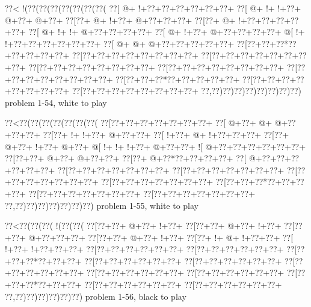 \vbox{\vbox{\goo
\0??<\- !(\0??(\0??(\0??(\0??(\0??(\0??(\0??(
\0??[\- @+\- !+\0??+\0??+\0??+\0??+\0??+\0??+
\0??[\- @+\- !+\- !+\0??+\- @+\0??+\- @+\0??+
\0??[\0??+\- @+\- !+\0??+\- @+\0??+\0??+\0??+
\0??[\0??+\- @+\- !+\0??+\0??+\0??+\0??+\0??+
\0??[\- @+\- !+\- !+\- @+\0??+\0??+\0??+\0??+
\0??[\- @+\- !+\0??+\- @+\0??+\0??+\0??+\0??+
\- @[\- !+\- !+\0??+\0??+\0??+\0??+\0??+\0??+
\0??[\- @+\- @+\- @+\0??+\0??+\0??+\0??+\0??+
\0??[\0??+\0??+\0??*\0??+\0??+\0??+\0??+\0??+
\0??[\0??+\0??+\0??+\0??+\0??+\0??+\0??+\0??+
\0??[\0??+\0??+\0??+\0??+\0??+\0??+\0??+\0??+
\0??[\0??+\0??+\0??+\0??+\0??+\0??+\0??+\0??+
\0??[\0??+\0??+\0??+\0??+\0??+\0??+\0??+\0??+
\0??[\0??+\0??+\0??+\0??+\0??+\0??+\0??+\0??+
\0??[\0??+\0??+\0??*\0??+\0??+\0??+\0??+\0??+
\0??[\0??+\0??+\0??+\0??+\0??+\0??+\0??+\0??+
\0??[\0??+\0??+\0??+\0??+\0??+\0??+\0??+\0??+
\0??,\0??)\0??)\0??)\0??)\0??)\0??)\0??)\0??)
}
\hfil problem 1-54, white to play\hfil\break
}

\vbox{\vbox{\goo
\0??<\0??(\0??(\0??(\0??(\0??(\0??(\0??(
\0??[\0??+\0??+\0??+\0??+\0??+\0??+\0??+
\0??[\- @+\0??+\- @+\- @+\0??+\0??+\0??+
\0??[\0??+\- !+\- !+\0??+\- @+\0??+\0??+
\0??[\- !+\0??+\- @+\- !+\0??+\0??+\0??+
\0??[\0??+\- @+\0??+\- !+\0??+\- @+\0??+
\- @[\- !+\- !+\- !+\0??+\- @+\0??+\0??+
\- ![\- @+\0??+\0??+\0??+\0??+\0??+\0??+
\0??[\0??+\0??+\- @+\0??+\- @+\0??+\0??+
\0??[\0??+\- @+\0??*\0??+\0??+\0??+\0??+
\0??[\- @+\0??+\0??+\0??+\0??+\0??+\0??+
\0??[\0??+\0??+\0??+\0??+\0??+\0??+\0??+
\0??[\0??+\0??+\0??+\0??+\0??+\0??+\0??+
\0??[\0??+\0??+\0??+\0??+\0??+\0??+\0??+
\0??[\0??+\0??+\0??+\0??+\0??+\0??+\0??+
\0??[\0??+\0??+\0??*\0??+\0??+\0??+\0??+
\0??[\0??+\0??+\0??+\0??+\0??+\0??+\0??+
\0??[\0??+\0??+\0??+\0??+\0??+\0??+\0??+
\0??,\0??)\0??)\0??)\0??)\0??)\0??)\0??)
}
\hfil problem 1-55, white to play\hfil\break
}

\vbox{\vbox{\goo
\0??<\0??(\0??(\0??(\- !(\0??(\0??(
\0??[\0??+\0??+\- @+\0??+\- !+\0??+
\0??[\0??+\0??+\- @+\0??+\- !+\0??+
\0??[\0??+\0??+\- @+\0??+\0??+\0??+
\0??[\0??+\0??+\- @+\0??+\- !+\0??+
\0??[\0??+\- !+\- @+\- !+\0??+\0??+
\0??[\- !+\0??+\- !+\0??+\0??+\0??+
\0??[\0??+\0??+\0??+\0??+\0??+\0??+
\0??[\0??+\0??+\0??+\0??+\0??+\0??+
\0??[\0??+\0??+\0??*\0??+\0??+\0??+
\0??[\0??+\0??+\0??+\0??+\0??+\0??+
\0??[\0??+\0??+\0??+\0??+\0??+\0??+
\0??[\0??+\0??+\0??+\0??+\0??+\0??+
\0??[\0??+\0??+\0??+\0??+\0??+\0??+
\0??[\0??+\0??+\0??+\0??+\0??+\0??+
\0??[\0??+\0??+\0??*\0??+\0??+\0??+
\0??[\0??+\0??+\0??+\0??+\0??+\0??+
\0??[\0??+\0??+\0??+\0??+\0??+\0??+
\0??,\0??)\0??)\0??)\0??)\0??)\0??)
}
\hfil problem 1-56, black to play\hfil\break
}

